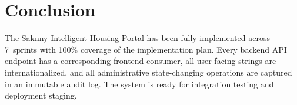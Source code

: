 \documentclass[12pt,a4paper]{article}
\begin{document}
\section{Conclusion}

The Saknny Intelligent Housing Portal has been fully implemented across 7~sprints with 100\% coverage of the implementation plan. Every backend API endpoint has a corresponding frontend consumer, all user-facing strings are internationalized, and all administrative state-changing operations are captured in an immutable audit log. The system is ready for integration testing and deployment staging.
\end{document}
